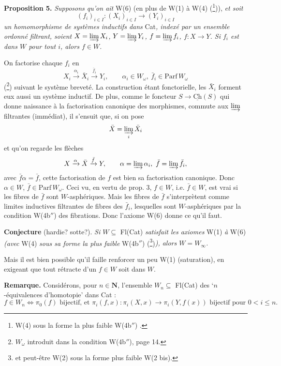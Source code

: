 \documentclass[11pt]{article}
\newcommand{\printedpage}[1]{\marginpar{\footnotesize p.~#1}}
\newcommand{\msp}[1]{\marginpar{\footnotesize [#1]}}
\newcommand{\Ch}{\underline{\mathrm{Ch}}}
\begin{document}
\textbf{Proposition 5.} \textit{Supposons qu'on ait} W(6) (en plus de W(1) à W(4) (\footnote[34]{W(4) sous la forme la plus faible W(4b$''$) .})),
\msp{page 15}\textit{et soit}
\[ (f_i)_{i\in I} : (X_i)_{i\in I} \longrightarrow (Y_i)_{i\in I} \]
\printedpage{13}
\textit{un homomorphisme de systèmes inductifs dans} Cat\textit{, indexé par un ensemble ordonné filtrant, soient $X = \varinjlim X_i$, $Y = \varinjlim Y_i$, $f = \varinjlim f_i$, $f : X \longrightarrow Y$. Si $f_i$ est dans $W$ pour tout $i$, alors $f \in W$.}

On factorise chaque $f_i$ en
\[ X_i \xrightarrow{\alpha_i} \bar{X}_i \xrightarrow{\bar{f}_i} Y_i, \qquad \alpha_i \in W_\omega,\ \bar{f}_i \in \mathrm{Parf}\, W_\omega \]
(\footnote[35]{$W_\omega$ introduit dans la condition W(4b$''$), page 14.}) suivant le système breveté. La construction étant fonctorielle, les $\bar{X}_i$ forment eux aussi un système inductif. De plus, comme le foncteur $S \longrightarrow \Ch(S)$ qui donne naissance à la factorisation canonique des morphismes, commute aux $\varinjlim$ filtrantes (immédiat), il s'ensuit que, si on pose
\[ \bar{X} = \varinjlim_{i} \bar{X}_i \]
et qu'on regarde les flèches
\[ X \xrightarrow{\alpha} \bar{X} \xrightarrow{\bar{f}} Y, \qquad \alpha = \varinjlim \alpha_i,\ \bar{f} = \varinjlim \bar{f}_i, \]
avec $\bar{f}\alpha = \bar{f}$, cette factorisation de $f$ est bien sa factorisation canonique. Donc $\alpha \in W$, %
$\bar{f} \in \mathrm{Parf}\, W_\omega$. Ceci vu, en vertu de prop. 3, $f \in W$, i.e. $\bar{f} \in W$, est vrai si les fibres de $\bar{f}$ sont $W$-asphériques. Mais les fibres de $\bar{f}$ s'interprètent comme limites inductives filtrantes de fibres des $\bar{f}_i$, lesquelles sont $W$-asphériques par la condition W(4b$''$) des fibrations. Donc l'axiome W(6) donne ce qu'il faut.

\textbf{Conjecture} (hardie? sotte?). \textit{Si $W \subseteq$} Fl(Cat) \textit{satisfait les axiomes} W(1) \textit{à} W(6) \textit{(avec} W(4) \textit{sous sa forme la plus faible} W(4b$''$) (\footnote[36]{et peut-être W(2) sous la forme plus faible W(2 bis).})\textit{), alors $W = W_\infty$.}

\msp{page 16}Mais il est bien possible qu'il faille renforcer un peu W(1) (saturation), en exigeant que tout rétracte d'un $f \in W$ soit dans $W$.

\textbf{Remarque.} Considérons, pour $n \in \mathbf{N}$, l'ensemble $W_n \subseteq$ Fl(Cat) des `$n$-équivalences d'homotopie' dans Cat :
\[ f \in W_n \iff \pi_0(f) \text{ bijectif, et } \pi_i(f, x) : \pi_i(X, x) \longrightarrow \pi_i(Y, f(x)) \text{ bijectif pour } 0 < i \leq n. \]
\end{document}
